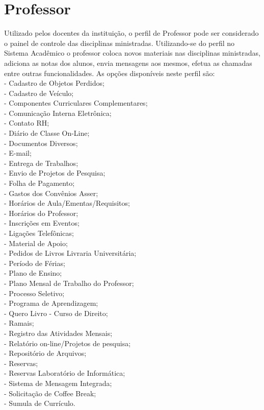 \section{Professor}
Utilizado pelos docentes da instituição, o perfil de Professor pode ser considerado o painel de controle das disciplinas
ministradas. Utilizando-se do perfil no Sistema Acadêmico o professor coloca novos materiais nas disciplinas ministradas,
adiciona as notas dos alunos, envia mensagens aos mesmos, efetua as chamadas entre outras funcionalidades.
As opções disponíveis neste perfil são: \\
- Cadastro de Objetos Perdidos; \\
- Cadastro de Veículo; \\
- Componentes Curriculares Complementares; \\
- Comunicação Interna Eletrônica; \\
- Contato RH; \\
- Diário de Classe On-Line; \\
- Documentos Diversos; \\
- E-mail; \\
- Entrega de Trabalhos; \\
- Envio de Projetos de Pesquisa; \\
- Folha de Pagamento; \\
- Gastos dos Convênios Asser; \\
- Horários de Aula/Ementas/Requisitos; \\
- Horários do Professor; \\
- Inscrições em Eventos; \\
- Ligações Telefônicas; \\
- Material de Apoio; \\
- Pedidos de Livros Livraria Universitária; \\
- Período de Férias; \\
- Plano de Ensino; \\
- Plano Mensal de Trabalho do Professor; \\
- Processo Seletivo; \\
- Programa de Aprendizagem; \\
- Quero Livro - Curso de Direito; \\
- Ramais; \\
- Registro das Atividades Mensais; \\
- Relatório on-line/Projetos de pesquisa; \\
- Repositório de Arquivos; \\
- Reservas; \\
- Reservas Laboratório de Informática; \\
- Sistema de Mensagem Integrada; \\
- Solicitação de Coffee Break; \\
- Sumula de Currículo. \\

